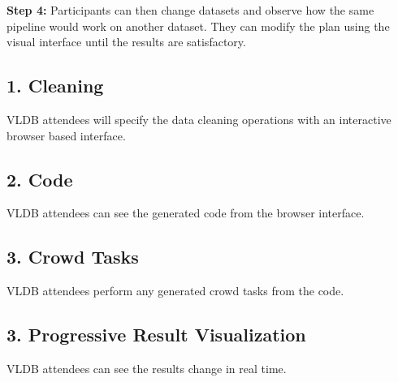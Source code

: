 \vspace{0.5em}

\noindent\textbf{Step 4: } Participants can then change datasets and observe how the same pipeline would work on another dataset.
They can modify the plan using the visual interface until the results are satisfactory.

\subsection{1. Cleaning}
VLDB attendees will specify the data cleaning operations with an interactive browser based
interface. 

\subsection{2. Code}
VLDB attendees can see the generated code from the browser interface.

\subsection{3. Crowd Tasks}
VLDB attendees perform any generated crowd tasks from the code.  

\subsection{3. Progressive Result Visualization}
VLDB attendees can see the results change in real time.  
\fi
